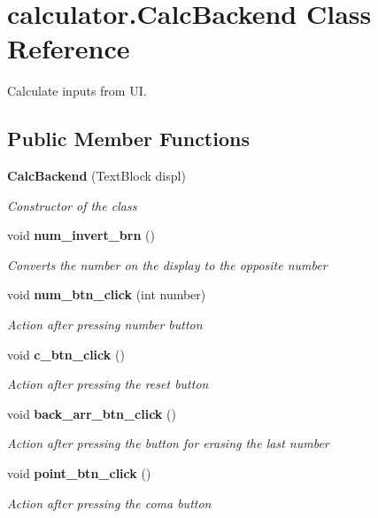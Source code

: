 \section{calculator.\+Calc\+Backend Class Reference}
\label{classcalculator_1_1_calc_backend}


Calculate inputs from UI.  


\subsection*{Public Member Functions}
\begin{DoxyCompactItemize}
\item 
\textbf{ Calc\+Backend} (Text\+Block displ)
\begin{DoxyCompactList}\small\item\em Constructor of the class \end{DoxyCompactList}\item 
void \textbf{ num\+\_\+invert\+\_\+brn} ()
\begin{DoxyCompactList}\small\item\em Converts the number on the display to the opposite number \end{DoxyCompactList}\item 
void \textbf{ num\+\_\+btn\+\_\+click} (int number)
\begin{DoxyCompactList}\small\item\em Action after pressing number button \end{DoxyCompactList}\item 
void \textbf{ c\+\_\+btn\+\_\+click} ()
\begin{DoxyCompactList}\small\item\em Action after pressing the reset button \end{DoxyCompactList}\item 
void \textbf{ back\+\_\+arr\+\_\+btn\+\_\+click} ()
\begin{DoxyCompactList}\small\item\em Action after pressing the button for erasing the last number \end{DoxyCompactList}\item 
void \textbf{ point\+\_\+btn\+\_\+click} ()
\begin{DoxyCompactList}\small\item\em Action after pressing the coma button \end{DoxyCompactList}\item 

\end{DoxyCompactItemize}
